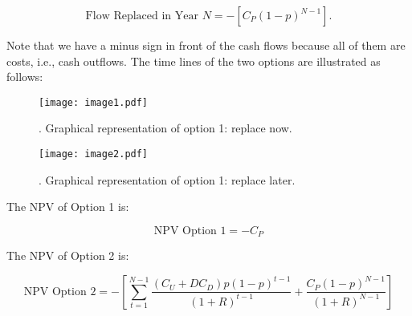 \begin{equation}\label{npv_5}
\mbox{Flow Replaced in Year }N= - \left[ C_{P} \left( 1-p \right) ^{N-1} \right] .
\end{equation}


Note that we have a minus sign in front of the cash flows because all of them are costs, i.e., cash outflows. The time lines of the two options are illustrated as follows: \par




\begin{figure}
    \centering
    \centerline{\texttt{[image: image1.pdf]}}
    \caption{. Graphical representation of option 1: replace now.}
    \label{fig:_Graphical_representation_of_option_1_replace_now}
\end{figure}





\begin{figure}
    \centering
    \centerline{\texttt{[image: image2.pdf]}}
    \caption{. Graphical representation of option 1: replace later.}
    \label{fig:_Graphical_representation_of_option_1_replace_later}
\end{figure}



The NPV of Option 1 is: \par



\begin{equation}\label{npv_6}
\mbox{NPV Option 1}= -C_{P}
\end{equation}


The NPV of Option 2 is:\par




\begin{equation}\label{npv_7}
\mbox{NPV Option }2= - \left[  \sum _{t=1}^{N-1}\frac{ \left( C_{U}+DC_{D} \right) p \left( 1-p \right) ^{t-1}}{ \left( 1+R \right) ^{t-1}}+\frac{C_{P} \left( 1-p \right) ^{N-1}}{ \left( 1+R \right) ^{N-1}} \right]
\end{equation}


